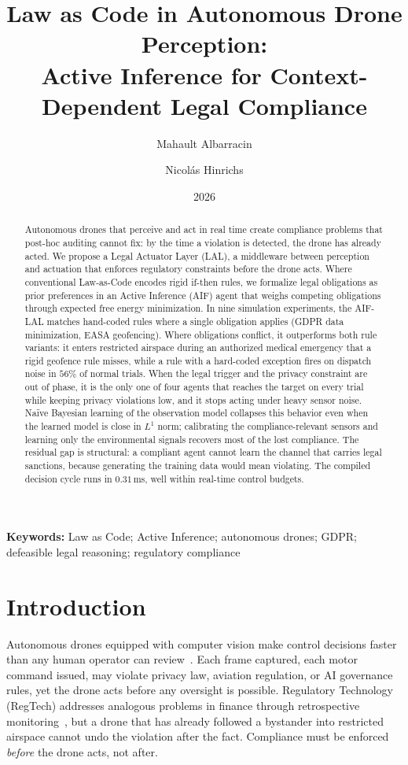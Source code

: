 \documentclass[10pt,twocolumn]{article}
\title{\LARGE \textbf{Law as Code in Autonomous Drone Perception:\\ Active Inference for Context-Dependent Legal Compliance}}
\author{Mahault Albarracin \and Nicolás Hinrichs}
\date{2026}
\begin{document}
\maketitle

\begin{abstract}
Autonomous drones that perceive and act in real time create compliance problems that post-hoc auditing cannot fix: by the time a violation is detected, the drone has already acted. We propose a Legal Actuator Layer (LAL), a middleware between perception and actuation that enforces regulatory constraints before the drone acts. Where conventional Law-as-Code encodes rigid if-then rules, we formalize legal obligations as prior preferences in an Active Inference (AIF) agent that weighs competing obligations through expected free energy minimization. In nine simulation experiments, the AIF-LAL matches hand-coded rules where a single obligation applies (GDPR data minimization, EASA geofencing). Where obligations conflict, it outperforms both rule variants: it enters restricted airspace during an authorized medical emergency that a rigid geofence rule misses, while a rule with a hard-coded exception fires on dispatch noise in $56\%$ of normal trials. When the legal trigger and the privacy constraint are out of phase, it is the only one of four agents that reaches the target on every trial while keeping privacy violations low, and it stops acting under heavy sensor noise. Na\"ive Bayesian learning of the observation model collapses this behavior even when the learned model is close in $L^1$ norm; calibrating the compliance-relevant sensors and learning only the environmental signals recovers most of the lost compliance. The residual gap is structural: a compliant agent cannot learn the channel that carries legal sanctions, because generating the training data would mean violating. The compiled decision cycle runs in $0.31\,$ms, well within real-time control budgets.
\end{abstract}

\noindent\textbf{Keywords:} Law as Code; Active Inference; autonomous drones; GDPR; defeasible legal reasoning; regulatory compliance

\section{Introduction}

Autonomous drones equipped with computer vision make control decisions faster than any human operator can review~\cite{hildebrandt2015}. Each frame captured, each motor command issued, may violate privacy law, aviation regulation, or AI governance rules, yet the drone acts before any oversight is possible. Regulatory Technology (RegTech) addresses analogous problems in finance through retrospective monitoring~\cite{arner2017}, but a drone that has already followed a bystander into restricted airspace cannot undo the violation after the fact. Compliance must be enforced \textit{before} the drone acts, not after.
\end{document}
